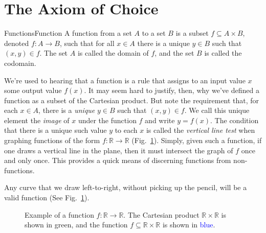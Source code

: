 \section{The Axiom of Choice}
        \begin{fdefinition}{Functions}{Function}
            A function from a set $A$ to a set $B$ is a subset
            $f\subseteq{A}\times{B}$, denoted $f:A\rightarrow{B}$, such that
            for all $x\in{A}$ there is a unique $y\in{B}$ such that
            $(x,y)\in{f}$. The set $A$ is called the domain of $f$, and the
            set $B$ is called the codomain.
        \end{fdefinition}
        We're used to hearing that a function is a rule that assigns to an
        input value $x$ some output value $f(x)$. It may seem hard to justify,
        then, why we've defined a function as a subset of the Cartesian
        product. But note the requirement that, for each $x\in{A}$, there is a
        \textit{unique} $y\in{B}$ such that $(x,y)\in{f}$. We call this unique
        element the \textit{image} of $x$ under the function $f$ and write
        $y=f(x)$. The condition that there is a unique such value $y$ to each
        $x$ is called the \textit{vertical line test} when graphing functions
        of the form $f:\mathbb{R}\rightarrow\mathbb{R}$
        (Fig.~\ref{fig:Function_R_to_R_Subset_Cart_Prod}). Simply, given such
        a function, if one draws a vertical line in the plane, then it must
        intersect the graph of $f$ once and only once. This provides a
        quick means of discerning functions from non-functions.
        \par\hfill\par
        Any curve that we draw left-to-right, without picking up the pencil,
        will be a valid function
        (See Fig.~\ref{fig:Function_R_to_R_Subset_Cart_Prod}).
        \begin{figure}[H]
            \centering
            
            \caption[Example of a Function
                     $f:\mathbb{R}\rightarrow\mathbb{R}$]
                    {Example of a function
                     $f:\mathbb{R}\rightarrow\mathbb{R}$.
                     The Cartesian product $\mathbb{R}\times\mathbb{R}$ is
                     shown in \textcolor{green!80!black}{green}, and the
                     function $f\subseteq\mathbb{R}\times\mathbb{R}$ is shown
                     in \textcolor{blue}{blue}.}
            \label{fig:Function_R_to_R_Subset_Cart_Prod}
        \end{figure}
